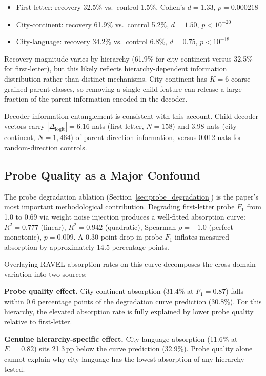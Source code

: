 \documentclass{article}
\begin{document}
\begin{itemize}
\item First-letter: recovery 32.5\% vs.\ control 1.5\%, Cohen's $d = 1.33$, $p = 0.000218$
\item City-continent: recovery 61.9\% vs.\ control 5.2\%, $d = 1.50$, $p < 10^{-20}$
\item City-language: recovery 34.2\% vs.\ control 6.8\%, $d = 0.75$, $p < 10^{-18}$
\end{itemize}

Recovery magnitude varies by hierarchy (61.9\% for city-continent versus 32.5\% for first-letter), but this likely reflects hierarchy-dependent information distribution rather than distinct mechanisms. City-continent has $K = 6$ coarse-grained parent classes, so removing a single child feature can release a large fraction of the parent information encoded in the decoder.

Decoder information entanglement is consistent with this account. Child decoder vectors carry $|\Delta_{\text{logit}}| = 6.16$ nats (first-letter, $N = 158$) and 3.98 nats (city-continent, $N = 1{,}464$) of parent-direction information, versus 0.012 nats for random-direction controls.

\subsection{Probe Quality as a Major Confound}

The probe degradation ablation (Section~\ref{sec:probe_degradation}) is the paper's most important methodological contribution. Degrading first-letter probe $F_1$ from 1.0 to 0.69 via weight noise injection produces a well-fitted absorption curve: $R^2 = 0.777$ (linear), $R^2 = 0.942$ (quadratic), Spearman $\rho = -1.0$ (perfect monotonic), $p = 0.009$. A 0.30-point drop in probe $F_1$ inflates measured absorption by approximately 14.5 percentage points.

Overlaying RAVEL absorption rates on this curve decomposes the cross-domain variation into two sources:

\textbf{Probe quality effect.} City-continent absorption (31.4\% at $F_1 = 0.87$) falls within 0.6 percentage points of the degradation curve prediction (30.8\%). For this hierarchy, the elevated absorption rate is fully explained by lower probe quality relative to first-letter.

\textbf{Genuine hierarchy-specific effect.} City-language absorption (11.6\% at $F_1 = 0.82$) sits 21.3\,pp below the curve prediction (32.9\%). Probe quality alone cannot explain why city-language has the lowest absorption of any hierarchy tested.
\end{document}
